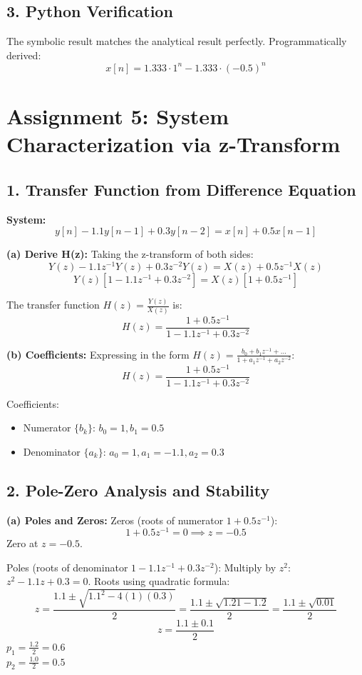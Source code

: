 \documentclass[11pt, a4paper]{article}
\begin{document}
\subsection{3. Python Verification}
The symbolic result matches the analytical result perfectly. Programmatically derived:
$$x[n] = 1.333 \cdot 1^n - 1.333 \cdot (-0.5)^n$$

\newpage
\section{Assignment 5: System Characterization via z-Transform}

\subsection{1. Transfer Function from Difference Equation}
\textbf{System:}
$$y[n] - 1.1y[n-1] + 0.3y[n-2] = x[n] + 0.5x[n-1]$$

\textbf{(a) Derive H(z):}
Taking the z-transform of both sides:
$$Y(z) - 1.1z^{-1}Y(z) + 0.3z^{-2}Y(z) = X(z) + 0.5z^{-1}X(z)$$
$$Y(z) [1 - 1.1z^{-1} + 0.3z^{-2}] = X(z) [1 + 0.5z^{-1}]$$

The transfer function $H(z) = \frac{Y(z)}{X(z)}$ is:
$$H(z) = \frac{1 + 0.5z^{-1}}{1 - 1.1z^{-1} + 0.3z^{-2}}$$

\textbf{(b) Coefficients:}
Expressing in the form $H(z) = \frac{b_0 + b_1 z^{-1} + \dots}{1 + a_1 z^{-1} + a_2 z^{-2}}$:
$$H(z) = \frac{1 + 0.5z^{-1}}{1 - 1.1z^{-1} + 0.3z^{-2}}$$

Coefficients:
\begin{itemize}
    \item Numerator $\{b_k\}$: $b_0 = 1, b_1 = 0.5$
    \item Denominator $\{a_k\}$: $a_0=1, a_1 = -1.1, a_2 = 0.3$
\end{itemize}

\subsection{2. Pole-Zero Analysis and Stability}

\textbf{(a) Poles and Zeros:}
Zeros (roots of numerator $1 + 0.5z^{-1}$):
$$1 + 0.5z^{-1} = 0 \implies z = -0.5$$
Zero at $z = -0.5$.

Poles (roots of denominator $1 - 1.1z^{-1} + 0.3z^{-2}$):
Multiply by $z^2$: $z^2 - 1.1z + 0.3 = 0$.
Roots using quadratic formula:
$$z = \frac{1.1 \pm \sqrt{1.1^2 - 4(1)(0.3)}}{2} = \frac{1.1 \pm \sqrt{1.21 - 1.2}}{2} = \frac{1.1 \pm \sqrt{0.01}}{2}$$
$$z = \frac{1.1 \pm 0.1}{2}$$
$p_1 = \frac{1.2}{2} = 0.6$\\
$p_2 = \frac{1.0}{2} = 0.5$
\end{document}

